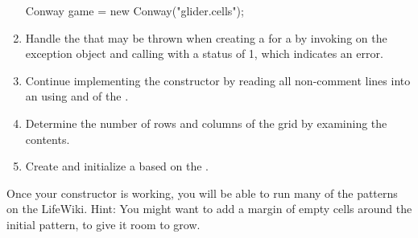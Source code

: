 \begin{exercise}
\begin{enumerate}
\begin{code}
Conway game = new Conway("glider.cells");
\end{code}

\item Handle the  that may be thrown when creating a  for a  by invoking  on the exception object and calling  with a status of 1, which indicates an error.

\item Continue implementing the constructor by reading all non-comment lines into an  using  and  of the .

\item Determine the number of rows and columns of the grid by examining the  contents.

\item Create and initialize a  based on the .

\end{enumerate}

Once your constructor is working, you will be able to run many of the patterns on the LifeWiki.
Hint: You might want to add a margin of empty cells around the initial pattern, to give it room to grow.

\end{exercise}


